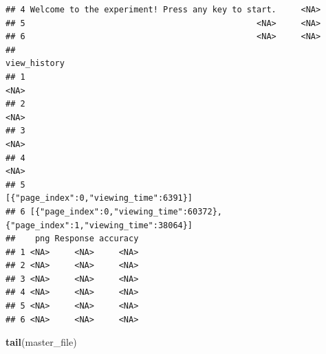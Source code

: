 \documentclass[
]{article}
\newenvironment{Shaded}{\begin{snugshade}}{\end{snugshade}}
\newcommand{\FunctionTok}[1]{\textcolor[rgb]{0.13,0.29,0.53}{\textbf{#1}}}
\newcommand{\NormalTok}[1]{#1}
\begin{document}
\begin{verbatim}
## 4 Welcome to the experiment! Press any key to start.     <NA>
## 5                                               <NA>     <NA>
## 6                                               <NA>     <NA>
##                                                                    view_history
## 1                                                                          <NA>
## 2                                                                          <NA>
## 3                                                                          <NA>
## 4                                                                          <NA>
## 5                                        [{"page_index":0,"viewing_time":6391}]
## 6 [{"page_index":0,"viewing_time":60372},{"page_index":1,"viewing_time":38064}]
##    png Response accuracy
## 1 <NA>     <NA>     <NA>
## 2 <NA>     <NA>     <NA>
## 3 <NA>     <NA>     <NA>
## 4 <NA>     <NA>     <NA>
## 5 <NA>     <NA>     <NA>
## 6 <NA>     <NA>     <NA>
\end{verbatim}

\begin{Shaded}
\begin{Highlighting}[]
\FunctionTok{tail}\NormalTok{(master\_file)}
\end{Highlighting}
\end{Shaded}
\end{document}
